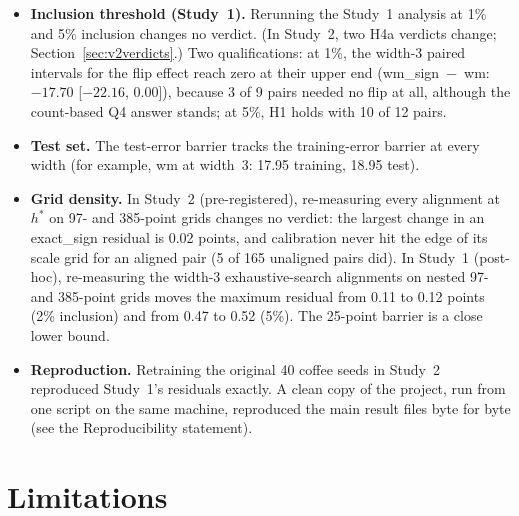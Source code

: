 \documentclass[11pt]{article}
\newcommand{\md}[1]{\textsf{#1}}
\begin{document}
\begin{itemize}[leftmargin=*]
\item \textbf{Inclusion threshold (Study~1).} Rerunning the Study~1 analysis at 1\% and 5\% inclusion changes no verdict. (In Study~2, two H4a verdicts change; Section~\ref{sec:v2verdicts}.) Two qualifications: at 1\%, the width-3 paired intervals for the flip effect reach zero at their upper end (\md{wm\_sign}~$-$~\md{wm}: $-17.70$ [$-22.16$, 0.00]), because 3 of 9 pairs needed no flip at all, although the count-based Q4 answer stands; at 5\%, H1 holds with 10 of 12 pairs.
\item \textbf{Test set.} The test-error barrier tracks the training-error barrier at every width (for example, \md{wm} at width~3: 17.95 training, 18.95 test).
\item \textbf{Grid density.} In Study~2 (pre-registered), re-measuring every alignment at $h^*$ on 97- and 385-point grids changes no verdict: the largest change in an \md{exact\_sign} residual is 0.02 points, and calibration never hit the edge of its scale grid for an aligned pair (5 of 165 unaligned pairs did). In Study~1 (post-hoc), re-measuring the width-3 exhaustive-search alignments on nested 97- and 385-point grids moves the maximum residual from 0.11 to 0.12 points (2\% inclusion) and from 0.47 to 0.52 (5\%). The 25-point barrier is a close lower bound.
\item \textbf{Reproduction.} Retraining the original 40 coffee seeds in Study~2 reproduced Study~1's residuals exactly. A clean copy of the project, run from one script on the same machine, reproduced the main result files byte for byte (see the Reproducibility statement).
\end{itemize}

\section{Limitations}
\label{sec:limits}
\end{document}
